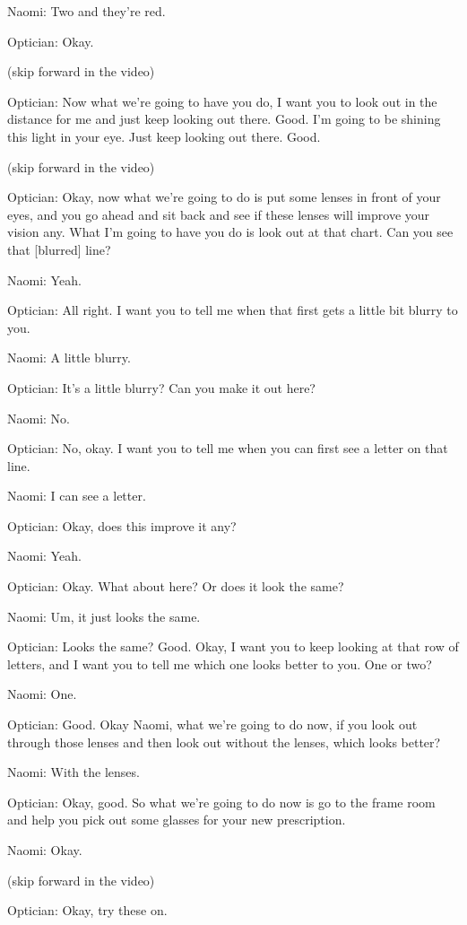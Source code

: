 Naomi: Two and they're red.

Optician: Okay.

(skip forward in the video)

Optician: Now what we're going to have you do, I want you to look out in the distance for me and just keep looking out there. Good. I'm going to be shining this light in your eye. Just keep looking out there. Good.

(skip forward in the video)

Optician: Okay, now what we're going to do is put some lenses in front of your eyes, and you go ahead and sit back and see if these lenses will improve your vision any. What I'm going to have you do is look out at that chart. Can you see that [blurred] line?

Naomi: Yeah.

Optician: All right. I want you to tell me when that first gets a little bit blurry to you.

Naomi: A little blurry.

Optician: It's a little blurry? Can you make it out here?

Naomi: No.

Optician: No, okay. I want you to tell me when you can first see a letter on that line.

Naomi: I can see a letter.

Optician: Okay, does this improve it any?

Naomi: Yeah.

Optician: Okay. What about here? Or does it look the same?

Naomi: Um, it just looks the same.

Optician: Looks the same? Good. Okay, I want you to keep looking at that row of letters, and I want you to tell me which one looks better to you. One or two?

Naomi: One.

Optician: Good. Okay Naomi, what we're going to do now, if you look out through those lenses and then look out without the lenses, which looks better?

Naomi: With the lenses.

Optician: Okay, good. So what we're going to do now is go to the frame room and help you pick out some glasses for your new prescription.

Naomi: Okay.

(skip forward in the video)

Optician: Okay, try these on.

